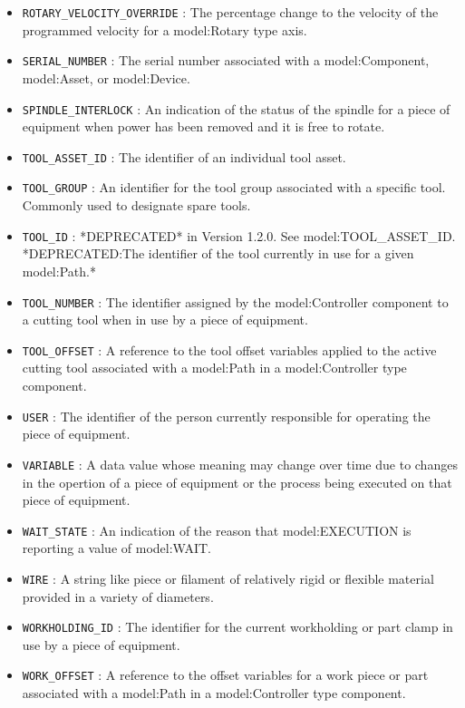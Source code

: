 \begin{itemize}
\item \texttt{ROTARY_VELOCITY_OVERRIDE} : The percentage change to the velocity of the programmed velocity for a {model:Rotary} type axis. 

\item \texttt{SERIAL_NUMBER} : The serial number associated with a {model:Component}, {model:Asset}, or {model:Device}. 

\item \texttt{SPINDLE_INTERLOCK} : An indication of the status of the spindle for a piece of equipment when power has been removed and it is free to rotate. 

\item \texttt{TOOL_ASSET_ID} : The identifier of an individual tool asset. 

\item \texttt{TOOL_GROUP} : An identifier for the tool group associated with a specific tool. Commonly used to designate spare tools. 

\item \texttt{TOOL_ID} : *DEPRECATED* in Version 1.2.0.   See {model:TOOL_ASSET_ID}. *DEPRECATED:The identifier of the tool currently in use for a given {model:Path}.* 

\item \texttt{TOOL_NUMBER} : The identifier assigned by the {model:Controller} component to a cutting tool when in use by a piece of equipment. 

\item \texttt{TOOL_OFFSET} : A reference to the tool offset variables applied to the active cutting tool associated with a {model:Path} in a {model:Controller} type component. 

\item \texttt{USER} : The identifier of the person currently responsible for operating the piece of equipment. 

\item \texttt{VARIABLE} : A data value whose meaning may change over time due to changes in the opertion of a piece of equipment or the process being executed on that piece of equipment. 

\item \texttt{WAIT_STATE} : An indication of the reason that {model:EXECUTION} is reporting a value of {model:WAIT}. 

\item \texttt{WIRE} : A string like piece or filament of relatively rigid or flexible material provided in a variety of diameters. 

\item \texttt{WORKHOLDING_ID} : The identifier for the current workholding or part clamp in use by a piece of equipment. 

\item \texttt{WORK_OFFSET} : A reference to the offset variables for a work piece or part associated with a {model:Path} in a {model:Controller} type component. 

\end{itemize}

